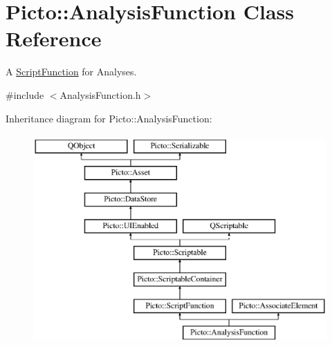 \hypertarget{class_picto_1_1_analysis_function}{\section{Picto\-:\-:Analysis\-Function Class Reference}
\label{class_picto_1_1_analysis_function}
}


A \hyperlink{class_picto_1_1_script_function}{Script\-Function} for Analyses.  




{\ttfamily \#include $<$Analysis\-Function.\-h$>$}

Inheritance diagram for Picto\-:\-:Analysis\-Function\-:\begin{figure}[H]
\begin{center}
\leavevmode
\includegraphics[height=8.000000cm]{class_picto_1_1_analysis_function}
\end{center}
\end{figure}
